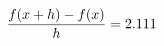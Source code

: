 \documentclass[preview]{standalone}
\begin{document}
\begin{align*}
\special{dvisvgm:raw <g id='unique000'>}\frac{f(x+h)-f(x)}{h} = 2.111\special{dvisvgm:raw </g>}
\end{align*}
\end{document}
